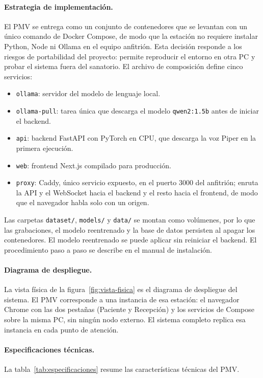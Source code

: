 \paragraph{Estrategia de implementación.} El PMV se entrega como un conjunto de contenedores que se levantan con un único comando de Docker Compose, de modo que la estación no requiere instalar Python, Node ni Ollama en el equipo anfitrión. Esta decisión responde a los riesgos de portabilidad del proyecto: permite reproducir el entorno en otra PC y probar el sistema fuera del sanatorio. El archivo de composición define cinco servicios:
\begin{itemize}
  \item \texttt{ollama}: servidor del modelo de lenguaje local.
  \item \texttt{ollama-pull}: tarea única que descarga el modelo \texttt{qwen2:1.5b} antes de iniciar el backend.
  \item \texttt{api}: backend FastAPI con PyTorch en CPU, que descarga la voz Piper en la primera ejecución.
  \item \texttt{web}: frontend Next.js compilado para producción.
  \item \texttt{proxy}: Caddy, único servicio expuesto, en el puerto 3000 del anfitrión; enruta la API y el WebSocket hacia el backend y el resto hacia el frontend, de modo que el navegador habla solo con un origen.
\end{itemize}
Las carpetas \texttt{dataset/}, \texttt{models/} y \texttt{data/} se montan como volúmenes, por lo que las grabaciones, el modelo reentrenado y la base de datos persisten al apagar los contenedores. El modelo reentrenado se puede aplicar sin reiniciar el backend. El procedimiento paso a paso se describe en el manual de instalación.

\paragraph{Diagrama de despliegue.} La vista física de la figura~\ref{fig:vista-fisica} es el diagrama de despliegue del sistema. El PMV corresponde a una instancia de esa estación: el navegador Chrome con las dos pestañas (Paciente y Recepción) y los servicios de Compose sobre la misma PC, sin ningún nodo externo. El sistema completo replica esa instancia en cada punto de atención.

\paragraph{Especificaciones técnicas.} La tabla~\ref{tab:especificaciones} resume las características técnicas del PMV.

